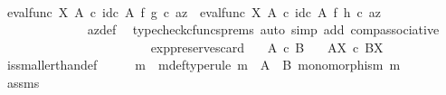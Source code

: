 \begin{isabellebody}
\ \ \ \ \ \ \ \ \ \ \isamarkupfalse%
\ \isamarkupfalse%
\ {\isachardoublequoteopen}{\isacharparenleft}{\kern0pt}eval{\isacharunderscore}{\kern0pt}func\ X\ A\ {\isasymcirc}\isactrlsub c\ id\isactrlsub c\ A\ {\isasymtimes}\isactrlsub f\ g{\isacharparenright}{\kern0pt}\ {\isasymcirc}\isactrlsub c\ az\ {\isacharequal}{\kern0pt}\ {\isacharparenleft}{\kern0pt}eval{\isacharunderscore}{\kern0pt}func\ X\ A\ {\isasymcirc}\isactrlsub c\ id\isactrlsub c\ A\ {\isasymtimes}\isactrlsub f\ h{\isacharparenright}{\kern0pt}\ {\isasymcirc}\isactrlsub c\ az{\isachardoublequoteclose}\isanewline
\ \ \ \ \ \ \ \ \ \ \ \ \isamarkupfalse%
\ az{\isacharunderscore}{\kern0pt}def\ \isamarkupfalse%
\ {\isacharparenleft}{\kern0pt}typecheck{\isacharunderscore}{\kern0pt}cfuncs{\isacharunderscore}{\kern0pt}prems{\isacharcomma}{\kern0pt}\ auto\ simp\ add{\isacharcolon}{\kern0pt}\ comp{\isacharunderscore}{\kern0pt}associative{}{\isacharparenright}{\kern0pt}\isanewline
\ \ \ \ \ \ \ \ \isamarkupfalse%
\isanewline
\ \ \ \ \ \ \isamarkupfalse%
\isanewline
\ \ \ \ \isamarkupfalse%
\isanewline
\ \ \isamarkupfalse%
\isanewline
{}\isamarkupfalse%
%
\endisatagproof
{\isafoldproof}%
%
\isadelimproof
\isanewline
%
\endisadelimproof
\isanewline
{}\isamarkupfalse%
\ exp{\isacharunderscore}{\kern0pt}preserves{\isacharunderscore}{\kern0pt}card{}{\isacharcolon}{\kern0pt}\isanewline
\ \ \ {\isachardoublequoteopen}A\ {\isasymle}\isactrlsub c\ B{\isachardoublequoteclose}\isanewline
\ \ \ {\isachardoublequoteopen}A\isactrlbsup X\isactrlesup \ {\isasymle}\isactrlsub c\ B\isactrlbsup X\isactrlesup {\isachardoublequoteclose}\isanewline
%
\isadelimproof
\ \ %
\endisadelimproof
%
\isatagproof
{}\isamarkupfalse%
\ is{\isacharunderscore}{\kern0pt}smaller{\isacharunderscore}{\kern0pt}than{\isacharunderscore}{\kern0pt}def\isanewline
{}\isamarkupfalse%
\ {\isacharminus}{\kern0pt}\isanewline
\ \ \isamarkupfalse%
\ m\ \ m{\isacharunderscore}{\kern0pt}def{\isacharbrackleft}{\kern0pt}type{\isacharunderscore}{\kern0pt}rule{\isacharbrackright}{\kern0pt}{\isacharcolon}{\kern0pt}\ {\isachardoublequoteopen}m\ {\isacharcolon}{\kern0pt}\ A\ {\isasymrightarrow}\ B{\isachardoublequoteclose}\ {\isachardoublequoteopen}monomorphism\ m{\isachardoublequoteclose}\isanewline
\ \ \ \ \ \ \ \ \isamarkupfalse%
\ assms\ \isamarkupfalse%

\end{isabellebody}
